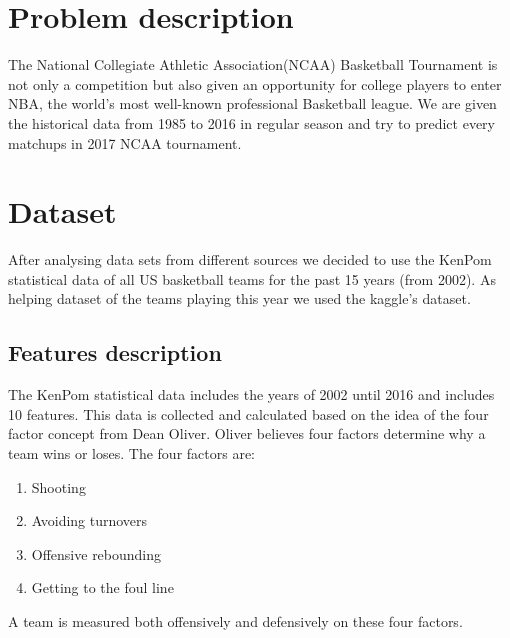 \documentclass[
10pt, %
a4paper, %
oneside, %
headinclude,footinclude, %
BCOR5mm, %
]{scrartcl}
\begin{document}





\section{Problem description}
The National Collegiate Athletic Association(NCAA) Basketball Tournament is not only a competition but also given an opportunity for college players to enter NBA, the world's most well-known professional Basketball league. We are given the historical data from 1985 to 2016 in regular season and try to predict every matchups in 2017 NCAA tournament.


\section{Dataset}
After analysing data sets from different sources we decided to use the KenPom statistical data of all US basketball teams for the past 15 years (from 2002). As helping dataset of the teams playing this year we used the kaggle's dataset.
\subsection{Features description}
The KenPom statistical data includes the years of 2002 until 2016 and includes 10 features. This data is collected and calculated based on the idea of the four factor concept from Dean Oliver.
Oliver believes four factors determine why a team wins or loses. The four factors are:
\begin{enumerate}
\item Shooting
\item Avoiding turnovers
\item Offensive rebounding
\item Getting to the foul line
\end{enumerate}
A team is measured both offensively and defensively on these four factors.
\end{document}

